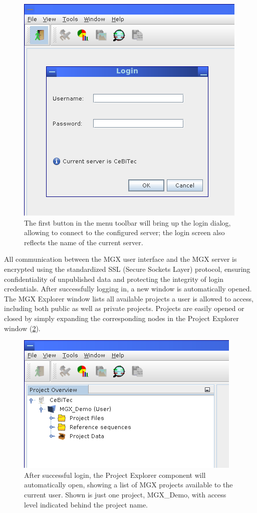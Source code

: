 \begin{figure}[H]
\centering
\includegraphics[width=.6\textwidth]{img/mgx/login}
\caption[Login screen]{The first button in the menu toolbar will bring up the login dialog, allowing to connect to the configured server; the login screen also reflects the name of the current server.}
\label{login-screen}
\end{figure}

All communication between the MGX user interface and the MGX server is encrypted using
the standardized SSL (Secure Sockets Layer) protocol, ensuring confidentiality of 
unpublished data and protecting the integrity of login credentials.
After successfully logging in, a new window is automatically opened. The MGX Explorer window
lists all available projects a user is allowed to access, including both public as well as
private projects. Projects are easily opened or closed by simply expanding the corresponding
nodes in the Project Explorer window (\ref{projects}).\\

\begin{figure}[H]
\centering
\includegraphics[width=.8\textwidth]{img/mgx/projects}
\caption[Project Explorer]{After successful login, the Project Explorer component will automatically open,
showing a list of MGX projects available to the current user. Shown is just one project, MGX\_Demo, with
access level indicated behind the project name.}
\label{projects}
\end{figure}

